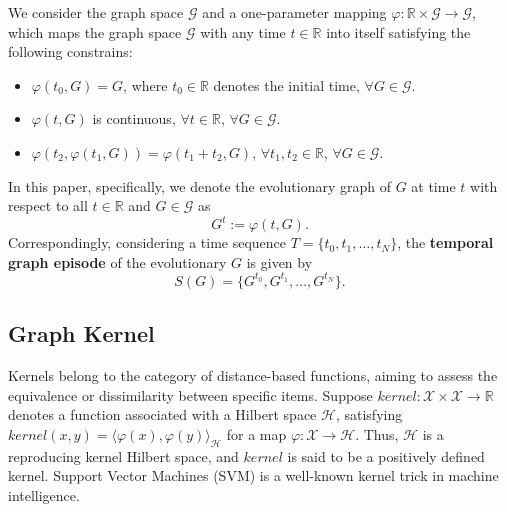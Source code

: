 \documentclass[10pt,journal,compsoc]{IEEEtran}
\begin{document}
We consider the graph space $\mathcal{G}$ and a one-parameter mapping $\varphi: \mathbb{R} \times \mathcal{G} \rightarrow \mathcal{G}$, which maps the graph space $\mathcal{G}$ with any time $t \in \mathbb{R}$ into itself satisfying the following constrains:

\begin{itemize}
\item[(1)] $\varphi(t_{0}, G) = G$, where $ t_{0}\in \mathbb{R}$ denotes the initial time, $\forall G \in \mathcal{G}$.
\item[(2)] $\varphi(t, G)$ is continuous, $\forall t \in \mathbb{R}$, $\forall G \in \mathcal{G}$.
\item[(3)] $\varphi(t_{2}, \varphi(t_{1}, G)) = \varphi(t_{1} + t_{2}, G)$, $\forall t_{1},  t_{2} \in \mathbb{R}$, $\forall G \in \mathcal{G}$.
\end{itemize}
In this paper, specifically, we denote the evolutionary graph of $G$ at time $t$ with respect to all $t\in \mathbb{R}$ and $G \in \mathcal{G}$ as
\begin{equation}
     G^{t} := \varphi(t, G).
\end{equation}
Correspondingly, considering a time sequence $T = \{t_{0}, t_{1}, \ldots, t_{N}\}$, the \textbf{temporal graph episode} of the evolutionary $G$ is given by
\begin{equation}\label{random-graph-episode}
  S(G) = \{G^{t_{0}}, G^{t_{1}}, \ldots, G^{t_{N}}\}.
\end{equation}


\subsection{Graph Kernel}
Kernels belong to the category of distance-based functions, aiming to assess the equivalence or dissimilarity between specific items. Suppose $kernel: \mathcal{X} \times \mathcal{X} \longrightarrow \mathbb{R}$ denotes a function associated with a Hilbert space $\mathcal{H}$, satisfying $kernel(x, y) = \langle \varphi(x), \varphi(y) \rangle_{\mathcal{H}}$ for a map $\varphi: \mathcal{X} \longrightarrow \mathcal{H}$. Thus, $\mathcal{H}$ is a reproducing kernel Hilbert space, and $kernel$ is said to be a positively defined kernel. Support Vector Machines (SVM) is a well-known kernel trick in machine intelligence.
\end{document}
